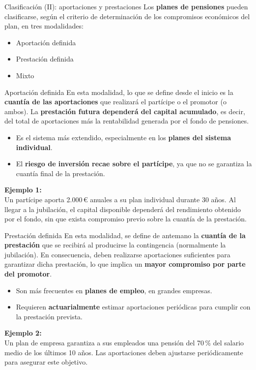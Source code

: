 \documentclass[
  ignorenonframetext,
  aspectratio=54,
  spanish,
]{beamer}
\providecommand{\tightlist}{%
  \setlength{\itemsep}{0pt}\setlength{\parskip}{0pt}}
\begin{document}
\begin{frame}{Clasificación (II): aportaciones y prestaciones}
\label{clasificaciuxf3n-ii-aportaciones-y-prestaciones}
Los \textbf{planes de pensiones} pueden clasificarse, según el criterio
de determinación de los compromisos económicos del plan, en tres
modalidades:

\begin{itemize}
\tightlist
\item
  Aportación definida
\item
  Prestación definida
\item
  Mixto
\end{itemize}
\end{frame}

\begin{frame}{Aportación definida}
\label{aportaciuxf3n-definida}
En esta modalidad, lo que se define desde el inicio es la
\textbf{cuantía de las aportaciones} que realizará el partícipe o el
promotor (o ambos). La \textbf{prestación futura dependerá del capital
acumulado}, es decir, del total de aportaciones más la rentabilidad
generada por el fondo de pensiones.

\begin{itemize}
\tightlist
\item
  Es el sistema más extendido, especialmente en los \textbf{planes del
  sistema individual}.
\item
  El \textbf{riesgo de inversión recae sobre el partícipe}, ya que no se
  garantiza la cuantía final de la prestación.
\end{itemize}

\textbf{Ejemplo 1:}\\
Un partícipe aporta 2.000\,€ anuales a su plan individual durante 30
años. Al llegar a la jubilación, el capital disponible dependerá del
rendimiento obtenido por el fondo, sin que exista compromiso previo
sobre la cuantía de la prestación.
\end{frame}

\begin{frame}{Prestación definida}
\label{prestaciuxf3n-definida}
En esta modalidad, se define de antemano la \textbf{cuantía de la
prestación} que se recibirá al producirse la contingencia (normalmente
la jubilación). En consecuencia, deben realizarse aportaciones
suficientes para garantizar dicha prestación, lo que implica un
\textbf{mayor compromiso por parte del promotor}.

\begin{itemize}
\tightlist
\item
  Son más frecuentes en \textbf{planes de empleo}, en grandes empresas.
\item
  Requieren \textbf{actuarialmente} estimar aportaciones periódicas para
  cumplir con la prestación prevista.
\end{itemize}

\textbf{Ejemplo 2:}\\
Un plan de empresa garantiza a sus empleados una pensión del 70\,\% del
salario medio de los últimos 10 años. Las aportaciones deben ajustarse
periódicamente para asegurar este objetivo.
\end{frame}
\end{document}
